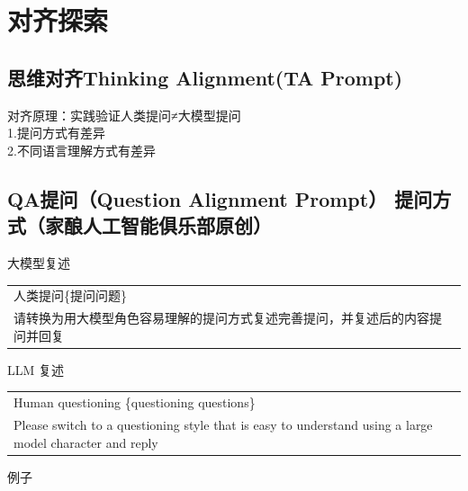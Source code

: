 \documentclass[12pt]{book}
\begin{document}
\chapter{对齐探索}
\section{思维对齐Thinking Alignment(TA Prompt)}
对齐原理：实践验证人类提问≠大模型提问\\
1.提问方式有差异\\
2.不同语言理解方式有差异\\


\section{QA提问（Question Alignment  Prompt） 提问方式（家酿人工智能俱乐部原创）}

\bigskip
大模型复述

\begin{tabular}{|p{15cm}|p{3cm}|}
	\hline
人类提问\{提问问题\}\\
请转换为用大模型角色容易理解的提问方式复述完善提问，并复述后的内容提问并回复\\
	\hline
\end{tabular}



\bigskip
LLM 复述

\begin{tabular}{|p{15cm}|p{3cm}|}
	\hline
Human questioning \{questioning questions\}\\
Please switch to a questioning style that is easy to understand using a large model character and reply\\
	\hline
\end{tabular}


\bigskip
例子
\end{document}
